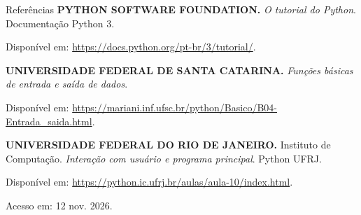 \begin{frame}[t,label=referencias-python]{Referências}
  \small
  \vspace{2mm}
  \textbf{PYTHON SOFTWARE FOUNDATION.} \emph{O tutorial do Python}. Documentação Python 3.\par
  {\footnotesize Disponível em: \url{https://docs.python.org/pt-br/3/tutorial/}.\par}
  \medskip
  \textbf{UNIVERSIDADE FEDERAL DE SANTA CATARINA.} \emph{Funções básicas de entrada e saída de dados}.\par
  {\footnotesize Disponível em: \url{https://mariani.inf.ufsc.br/python/Basico/B04-Entrada_saida.html}.\par}
  \medskip
  \textbf{UNIVERSIDADE FEDERAL DO RIO DE JANEIRO.} Instituto de Computação.
  \emph{Interação com usuário e programa principal}. Python UFRJ.\par
  {\footnotesize Disponível em: \url{https://python.ic.ufrj.br/aulas/aula-10/index.html}.\par}
  \medskip
  {\footnotesize Acesso em: 12 nov. 2026.}
\end{frame}

